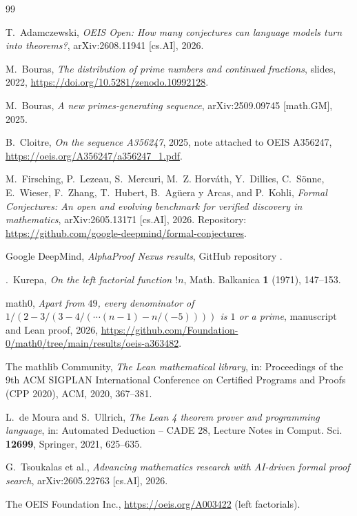 \documentclass[11pt]{amsart}
\theoremstyle{plain}
\theoremstyle{definition}
\begin{document}
\begin{thebibliography}{99}

T.~Adamczewski, \emph{OEIS Open: How many conjectures can language models turn into theorems?}, arXiv:2608.11941 [cs.AI], 2026.

M.~Bouras, \emph{The distribution of prime numbers and continued fractions}, slides, 2022, \url{https://doi.org/10.5281/zenodo.10992128}.

M.~Bouras, \emph{A new primes-generating sequence}, arXiv:2509.09745 [math.GM], 2025.

B.~Cloitre, \emph{On the sequence A356247}, 2025, note attached to OEIS A356247, \url{https://oeis.org/A356247/a356247_1.pdf}.

M.~Firsching, P.~Lezeau, S.~Mercuri, M.~Z. Horv\'ath, Y.~Dillies, C.~S\"onne, E.~Wieser, F.~Zhang, T.~Hubert, B.~Ag\"uera y Arcas, and P.~Kohli, \emph{Formal Conjectures: An open and evolving benchmark for verified discovery in mathematics}, arXiv:2605.13171 [cs.AI], 2026. Repository: \url{https://github.com/google-deepmind/formal-conjectures}.

Google DeepMind, \emph{AlphaProof Nexus results}, GitHub repository .

\DJ.~Kurepa, \emph{On the left factorial function $!n$}, Math. Balkanica \textbf{1} (1971), 147--153.

math0, \emph{Apart from $49$, every denominator of $1/(2-3/(3-4/(\cdots(n-1)-n/(-5))))$ is $1$ or a prime}, manuscript and Lean proof, 2026, \url{https://github.com/Foundation-0/math0/tree/main/results/oeis-a363482}.

The mathlib Community, \emph{The Lean mathematical library}, in: Proceedings of the 9th ACM SIGPLAN International Conference on Certified Programs and Proofs (CPP 2020), ACM, 2020, 367--381.

L.~de Moura and S.~Ullrich, \emph{The Lean 4 theorem prover and programming language}, in: Automated Deduction -- CADE 28, Lecture Notes in Comput. Sci. \textbf{12699}, Springer, 2021, 625--635.

G.~Tsoukalas et al., \emph{Advancing mathematics research with AI-driven formal proof search}, arXiv:2605.22763 [cs.AI], 2026.

The OEIS Foundation Inc., \url{https://oeis.org/A003422} (left factorials).


\end{thebibliography}
\end{document}
